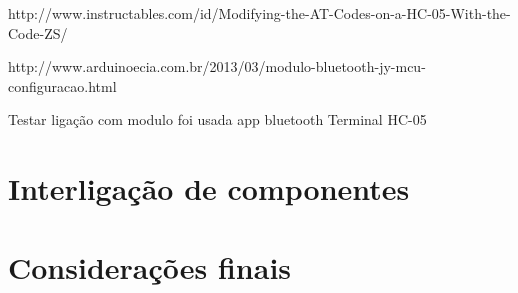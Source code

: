 http://www.instructables.com/id/Modifying-the-AT-Codes-on-a-HC-05-With-the-Code-ZS/


http://www.arduinoecia.com.br/2013/03/modulo-bluetooth-jy-mcu-configuracao.html


Testar ligação com modulo foi usada app bluetooth Terminal HC-05


\section{Interligação de componentes}




\section{Considerações finais}
